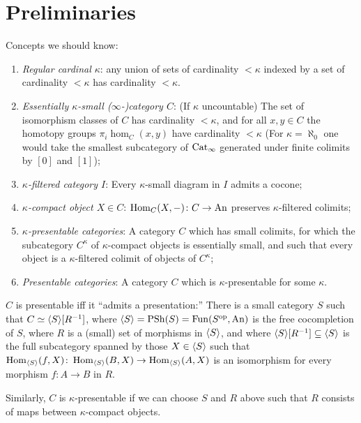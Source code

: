 \documentclass[11pt]{book}
\begin{document}
	\section{Preliminaries}

	Concepts we should know:
	\begin{enumerate}
		\item[(-2)] \emph{Regular cardinal $\kappa$}: any union of sets of cardinality $< \kappa$ indexed by a set of cardinality $< \kappa$ has cardinality $< \kappa$.
		\item[(-1)] \emph{Essentially $\kappa$-small ($\infty$-)category $C$}: (If $\kappa$ uncountable) The set of isomorphism classes of $C$ has cardinality $< \kappa$, and for all $x,y \in C$ the homotopy groups $\pi_i\hom_C(x,y)$ have cardinality $<\kappa$ (For $\kappa = \aleph_0$ one would take the smallest subcategory of ${\textup{Cat}}_{\infty}$ generated under finite colimits by $[0]$ and $[1]$);
		\item[(0)] \emph{$\kappa$-filtered category $I$}: Every $\kappa$-small diagram in $I$ admits a cocone;
		\item[(1)] \emph{$\kappa$-compact object $X \in C$}: $\operatorname{Hom}_C(X,-)\colon C \to {\textup{An}}$ preserves $\kappa$-filtered colimits;
		\item[(2)] \emph{$\kappa$-presentable categories}: A category $C$ which has small colimits, for which the subcategory $C^{\kappa}$ of $\kappa$-compact objects is essentially small, and such that every object is a $\kappa$-filtered colimit of objects of $C^{\kappa}$;
		\item[(3)] \emph{Presentable categories}: A category $C$ which is $\kappa$-presentable for some $\kappa$.
	\end{enumerate}

	\begin{remark}
		$C$ is presentable iff it ``admits a presentation:'' There is a small category $S$ such that $C \simeq \langle S \rangle[R^{-1}]$, where $\langle S \rangle = \operatorname{PSh}(S) = \operatorname{Fun}(S^{\textup{op}},{\textup{An}})$ is the free cocompletion of $S$, where $R$ is a (small) set of morphisms in $\langle S \rangle$, and where $\langle S \rangle[R^{-1}] \subseteq \langle S \rangle$ is the full subcategory spanned by those $X \in \langle S \rangle$ such that $\operatorname{Hom}_{\langle S \rangle}(f,X)\colon \operatorname{Hom}_{\langle S \rangle}(B,X) \to \operatorname{Hom}_{\langle S \rangle}(A,X)$ is an isomorphism for every morphism $f\colon A \to B$ in $R$.

		Similarly, $C$ is $\kappa$-presentable if we can choose $S$ and $R$ above such that $R$ consists of maps between $\kappa$-compact objects.
	\end{remark}
\end{document}
